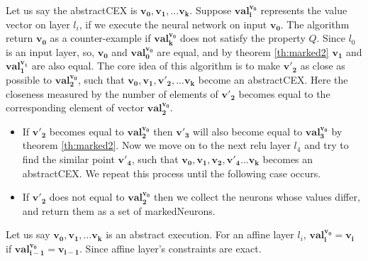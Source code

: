 Let us say the abstractCEX is $\boldsymbol{v_0}, \boldsymbol{v_1}, ... \boldsymbol{v_k}$. 
Suppose $\boldsymbol{val_i^{\boldsymbol{v_0}}}$ represents the value vector on layer $l_i$, 
if we execute the neural network on input $\boldsymbol{v_0}$. 
The algorithm return $\boldsymbol{v_0}$ as a counter-example if $\boldsymbol{val_k^{\boldsymbol{v_0}}}$ 
does not satisfy the property $Q$. 
Since $l_0$ is an input layer, so, $\boldsymbol{v_0}$ and $\boldsymbol{val_0^{v_0}}$ are equal, 
and by theorem \ref{th:marked2} $\boldsymbol{v_1}$ and $\boldsymbol{val_1^{v_1}}$ are also equal. 
The core idea of this algorithm is to make $\boldsymbol{v'_2}$ as close as possible to $\boldsymbol{val_2^{v_0}}$, 
such that $\boldsymbol{v_0}, \boldsymbol{v_1}, \boldsymbol{v'_2}, ... \boldsymbol{v_k}$ become an abstractCEX. 
Here the closeness measured by the number of elements of $\boldsymbol{v'_2}$ becomes equal to the 
corresponding element of vector $\boldsymbol{val_2^{v_0}}$.
\begin{itemize}
  \item If $\boldsymbol{v'_2}$ becomes equal to $\boldsymbol{val_2^{v_0}}$ then $\boldsymbol{v'_3}$ will also become 
    equal to $\boldsymbol{val_3^{v_0}}$ by theorem \ref{th:marked2}. 
    Now we move on to the next relu layer $l_4$ and try to find the similar point $\boldsymbol{v'_4}$, such that 
    $\boldsymbol{v_0}, \boldsymbol{v_1}, \boldsymbol{v_2}, \boldsymbol{v'_4}... \boldsymbol{v_k}$ becomes an abstractCEX. 
    We repeat this process until the following case occurs. 
  \item If $\boldsymbol{v'_2}$ does not equal to $\boldsymbol{val_2^{v_0}}$ then we collect the neurons whose values differ, 
        and return them as a set of markedNeurons. 
\end{itemize}



\begin{theorem}
  \label{th:marked2}
  Let us say $\boldsymbol{v_0}, \boldsymbol{v_1}, ... \boldsymbol{v_k}$ is an abstract execution. 
  For an affine layer $l_i$, $\boldsymbol{val_i^{\boldsymbol{v_0}}} = \boldsymbol{v_i}$ if $\boldsymbol{val_{i-1}^{\boldsymbol{v_0}}} = \boldsymbol{v_{i-1}}$.  
  Since affine layer's constraints are exact.  
\end{theorem}
 

